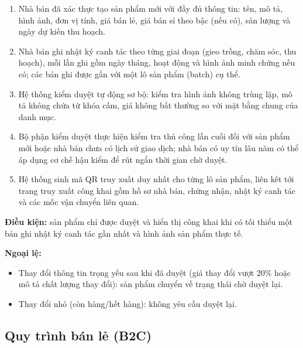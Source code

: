 \begin{enumerate}
    \item Nhà bán đã xác thực tạo sản phẩm mới với đầy đủ thông tin: tên, mô tả, hình ảnh, đơn vị tính, giá bán lẻ, giá bán sỉ theo bậc (nếu có), sản lượng và ngày dự kiến thu hoạch.
    \item Nhà bán ghi nhật ký canh tác theo từng giai đoạn (gieo trồng, chăm sóc, thu hoạch), mỗi lần ghi gồm ngày tháng, hoạt động và hình ảnh minh chứng nếu có; các bản ghi được gắn với một lô sản phẩm (batch) cụ thể.
    \item Hệ thống kiểm duyệt tự động sơ bộ: kiểm tra hình ảnh không trùng lặp, mô tả không chứa từ khóa cấm, giá không bất thường so với mặt bằng chung của danh mục.
    \item Bộ phận kiểm duyệt thực hiện kiểm tra thủ công lần cuối đối với sản phẩm mới hoặc nhà bán chưa có lịch sử giao dịch; nhà bán có uy tín lâu năm có thể áp dụng cơ chế hậu kiểm để rút ngắn thời gian chờ duyệt.
    \item Hệ thống sinh mã QR truy xuất duy nhất cho từng lô sản phẩm, liên kết tới trang truy xuất công khai gồm hồ sơ nhà bán, chứng nhận, nhật ký canh tác và các mốc vận chuyển liên quan.
\end{enumerate}

\textbf{Điều kiện:} sản phẩm chỉ được duyệt và hiển thị công khai khi có tối thiểu một bản ghi nhật ký canh tác gần nhất và hình ảnh sản phẩm thực tế.

\textbf{Ngoại lệ:}
\begin{itemize}
    \item Thay đổi thông tin trọng yếu sau khi đã duyệt (giá thay đổi vượt 20\% hoặc mô tả chất lượng thay đổi): sản phẩm chuyển về trạng thái chờ duyệt lại.
    \item Thay đổi nhỏ (còn hàng/hết hàng): không yêu cầu duyệt lại.
\end{itemize}



\subsection{Quy trình bán lẻ (B2C)}

